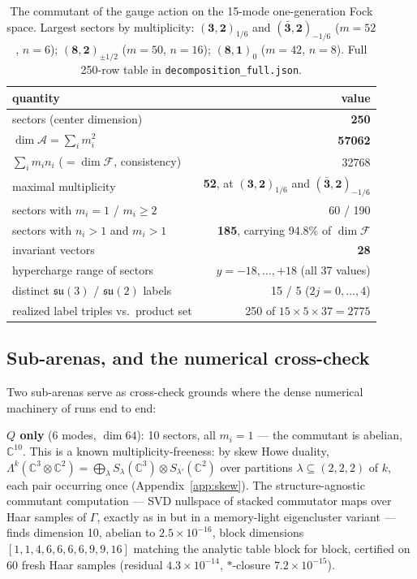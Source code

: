 \documentclass[11pt]{article}
\newcommand{\CC}{\mathbb{C}}
\newcommand{\Alg}{\mathcal{A}}
\newcommand{\Fock}{\mathcal{F}}
\newcommand{\su}[1]{\mathfrak{su}(#1)}
\newcommand{\rep}[2]{(\mathbf{#1})_{#2}}
\begin{document}
\begin{table}[ht]
\centering
\small
\begin{tabular}{lr}
\toprule
quantity & value \\
\midrule
sectors (center dimension) & \textbf{250} \\
$\dim\Alg = \sum_i m_i^2$ & \textbf{57062} \\
$\sum_i m_i n_i$ ($= \dim\Fock$, consistency) & 32768 \\
maximal multiplicity & \textbf{52}, at $\rep{3,2}{1/6}$ and $(\bar{\mathbf{3}},\mathbf{2})_{-1/6}$ \\
sectors with $m_i = 1$ / $m_i\geq 2$ & 60 / 190 \\
sectors with $n_i>1$ and $m_i>1$ & \textbf{185}, carrying 94.8\% of $\dim\Fock$ \\
invariant vectors & \textbf{28} \\
hypercharge range of sectors & $y = -18,\ldots,+18$ (all 37 values) \\
distinct $\su3$ / $\su2$ labels & 15 / 5 ($2j = 0,\ldots,4$) \\
realized label triples vs.\ product set & 250 of $15\times5\times37 = 2775$ \\
\bottomrule
\end{tabular}
\caption{The commutant of the gauge action on the 15-mode one-generation Fock space. Largest sectors by multiplicity: $\rep{3,2}{1/6}$ and $(\bar{\mathbf{3}},\mathbf{2})_{-1/6}$ ($m=52$, $n=6$); $(\mathbf{8},\mathbf{2})_{\pm1/2}$ ($m=50$, $n=16$); $(\mathbf{8},\mathbf{1})_{0}$ ($m=42$, $n=8$). Full 250-row table in \texttt{decomposition\_full.json}.}
\label{tab:headline}
\end{table}

\subsection{Sub-arenas, and the numerical cross-check}\label{sec:subarenas}

Two sub-arenas serve as cross-check grounds where the dense numerical machinery of \cite{p2} runs end to end:

\textbf{$Q$ only} (6 modes, $\dim 64$): 10 sectors, all $m_i = 1$ --- the commutant is abelian, $\CC^{10}$. This is a known multiplicity-freeness: by skew Howe duality, $\Lambda^k(\CC^3\otimes\CC^2) = \bigoplus_{\lambda} S_\lambda(\CC^3)\otimes S_{\lambda'}(\CC^2)$ over partitions $\lambda\subseteq(2,2,2)$ of $k$, each pair occurring once (Appendix~\ref{app:skew}). The structure-agnostic commutant computation --- SVD nullspace of stacked commutator maps over Haar samples of $\Gamma$, exactly as in \cite{p2} but in a memory-light eigencluster variant --- finds dimension 10, abelian to $2.5\times10^{-16}$, block dimensions $[1,1,4,6,6,6,6,9,9,16]$ matching the analytic table block for block, certified on 60 fresh Haar samples (residual $4.3\times10^{-14}$, $*$-closure $7.2\times10^{-15}$).
\end{document}
